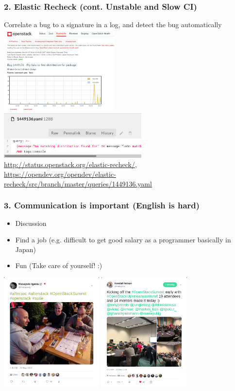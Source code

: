 \documentclass[aspectratio=169,11pt,hyperref={colorlinks=true}]{beamer}
\begin{document}
\begin{frame}
  \frametitle{2. Elastic Recheck (cont. Unstable and Slow CI)}
    Correlate a bug to a signature in a log, and detect the bug automatically
  \centering\includegraphics[width=60mm]{images/elastic-recheck.png}
  \centering\includegraphics[width=75mm]{images/elastic-recheck-source.png}
  \url{http://status.openstack.org/elastic-recheck/},
  \url{https://opendev.org/opendev/elastic-recheck/src/branch/master/queries/1449136.yaml}
\end{frame}

\begin{frame}
  \frametitle{3. Communication is important (English is hard)}
  \begin{itemize}
    \item Discussion
    \item Find a job (e.g. difficult to get good salary as a programmer basically in Japan)
    \item Fun (Take care of yourself! :)
  \end{itemize}
  \centering\includegraphics[height=60mm]{images/tweet-suse.png}
  \centering\includegraphics[height=60mm]{images/tweet-oui.png}
\end{frame}
\end{document}
